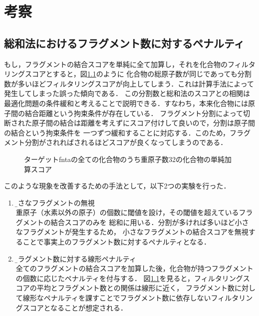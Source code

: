 \chapter{考察}

\section{総和法におけるフラグメント数に対するペナルティ}\label{sec:discussion_penalty}
もし，フラグメントの結合スコアを単純に全て加算し，それを化合物のフィルタリングスコアとすると，図\ref{fig:no_omit_score_graph}のように
化合物の総原子数が同じであっても分割数が多いほどフィルタリングスコアが向上してしまう．これは計算手法によって発生してしまった誤った傾向である．
この分割数と総和法のスコアとの相関は最適化問題の条件緩和と考えることで説明できる．すなわち，本来化合物には原子間の結合距離という拘束条件が存在している．
フラグメント分割によって切断された原子間の結合は距離を考えずにスコア付けして良いので，分割は原子間の結合という拘束条件を
一つずつ緩和することに対応する．このため，フラグメント分割がされればされるほどスコアが良くなってしまうのである．
\begin{figure}[b]
 \begin{center}
  \caption{ターゲットfntaの全ての化合物のうち重原子数32の化合物の単純加算スコア}
  \label{fig:no_omit_score_graph}
 \end{center}
\end{figure}

このような現象を改善するための手法として，以下2つの実験を行った．
\begin{enumerate}
\item \b{小さなフラグメントの無視}\\ 
	重原子（水素以外の原子）の個数に閾値を設け，その閾値を超えているフラグメントの結合スコアのみを
	総和に用いる．分割が多ければ多いほど小さなフラグメントが発生するため，
	小さなフラグメントの結合スコアを無視することで事実上のフラグメント数に対するペナルティとなる．
\item \b{フラグメント数に対する線形ペナルティ}\\
	全てのフラグメントの結合スコアを加算した後，化合物が持つフラグメントの個数に応じたペナルティを付与する．
	図\ref{fig:no_omit_score_graph}を見ると，フィルタリングスコアの平均とフラグメント数との関係は線形に近く，
	フラグメント数に対して線形なペナルティを課すことでフラグメント数に依存しないフィルタリングスコアとなることが想定される．
\end{enumerate}

